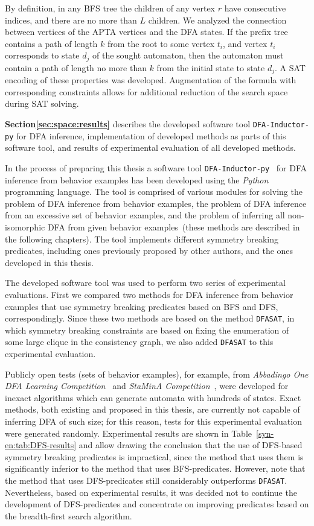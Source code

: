 By definition, in any BFS tree the children of any vertex $r$ have consecutive indices, and there are no more than $L$ children.
We analyzed the connection between vertices of the APTA vertices and the DFA states.
If the prefix tree contains a path of length $k$ from the root to some vertex $t_{i}$, and vertex $t_{i}$ corresponds to state $d_{j}$ of the sought automaton, then
the automaton must contain a path of length no more than $k$ from the initial state to state $d_{j}$.
A SAT encoding of these properties was developed.
Augmentation of the formula with corresponding constraints allows for additional reduction of the search space during SAT solving.

\textbf{Section{\ref{sec:space:results}}} describes the developed software tool \texttt{DFA-Inductor-py} for DFA inference, implementation of developed methods as parts of 
this software tool, and results of experimental evaluation of all developed methods.

In the process of preparing this thesis a software tool \texttt{DFA-Inductor-py}~\cite{dfa-inductor-py-en} for DFA inference from behavior examples has been developed using the 
\emph{Python} programming language.
The tool is comprised of various modules for solving the problem of DFA inference from behavior examples, the problem of DFA inference from an excessive set of 
behavior examples, and the problem of inferring all non-isomorphic DFA from given behavior examples~(these methods are described in the following chapters).
The tool implements different symmetry breaking predicates, including ones previously proposed by other authors, and the ones developed in this thesis.

The developed software tool was used to perform two series of experimental evaluations.
First we compared two methods for DFA inference from behavior examples that use symmetry breaking predicates based on BFS and DFS, correspondingly.
Since these two methods are based on the method \texttt{DFASAT}, in which symmetry breaking constraints are based on fixing the enumeration of some large clique in the consistency graph, we also added \texttt{DFASAT} to this experimental evaluation.

Publicly open tests (sets of behavior examples), for example, from \emph{Abbadingo One DFA Learning Competition}~\cite{DBLP:conf/icgi/LangPP98} and \emph{StaMinA Competition}~\cite{DBLP:journals/ese/WalkinshawLDBD13}, were developed for inexact algorithms which can generate automata with hundreds of states.
Exact methods, both existing and proposed in this thesis, are currently not capable of inferring DFA of such size; for this reason, tests for this experimental evaluation
were generated randomly.
Experimental results are shown in Table~\ref{syn-en:tab:DFS-results} and allow drawing the conclusion that the use of DFS-based symmetry breaking predicates is impractical,
since the method that uses them is significantly inferior to the method that uses BFS-predicates.
However, note that the method that uses DFS-predicates still considerably outperforms \texttt{DFASAT}.
Nevertheless, based on experimental results, it was decided not to continue the development of DFS-predicates and concentrate on improving predicates based on the 
breadth-first search algorithm.

